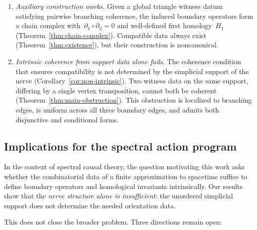 \documentclass[11pt,a4paper]{article}
\theoremstyle{plain}
\theoremstyle{definition}
\theoremstyle{remark}
\begin{document}
\begin{enumerate}[nosep]
  \item \emph{Auxiliary construction works.}
    Given a global triangle witness datum satisfying pairwise branching
    coherence, the induced boundary operators form a chain complex
    with~$\partial_1 \circ \partial_2 = 0$ and well-defined first
    homology~$H_1$ (Theorem~\ref{thm:chain-complex}).
    Compatible data always exist (Theorem~\ref{thm:existence}),
    but their construction is noncanonical.

  \item \emph{Intrinsic coherence from support data alone fails.}
    The coherence condition that ensures compatibility is not determined
    by the simplicial support of the nerve
    (Corollary~\ref{cor:non-intrinsic}).
    Two witness data on the same support, differing by a single vertex
    transposition, cannot both be coherent
    (Theorem~\ref{thm:main-obstruction}).
    This obstruction is localized to branching edges, is uniform across
    all three boundary edges, and admits both disjunctive and
    conditional forms.
\end{enumerate}

\subsection{Implications for the spectral action program}

In the context of spectral causal theory, the question motivating this
work asks whether the combinatorial data of a finite
approximation to spacetime suffice to define boundary operators and
homological invariants intrinsically. Our results show that the
\emph{nerve structure alone is insufficient}: the unordered simplicial
support does not determine the needed orientation data.

This does not close the broader problem. Three directions remain open:
\end{document}
